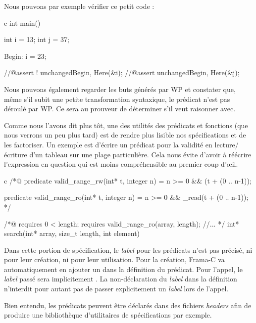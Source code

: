 Nous pouvons par exemple vérifier ce petit code :



\begin{CodeBlock}{c}
int main(){
  int i = 13;
  int j = 37;

 Begin:
  i = 23;
 
  //@assert ! unchanged{Begin, Here}(&i);
  //@assert   unchanged{Begin, Here}(&j);
}
\end{CodeBlock}



Nous pouvons également regarder les buts générés par WP et constater que, 
même s'il subit une petite transformation syntaxique, le prédicat n'est pas 
déroulé par WP. Ce sera au prouveur de déterminer s'il veut raisonner avec.



Comme nous l'avons dit plus tôt, une des utilités des prédicats et fonctions (que 
nous verrons un peu plus tard) est de rendre plus lisible nos spécifications et 
de les factoriser. Un exemple est d'écrire un prédicat pour la validité en 
lecture/écriture d'un tableau sur une plage particulière. Cela nous évite d'avoir
à réécrire l'expression en question qui est moins compréhensible au premier 
coup d’œil.



\begin{CodeBlock}{c}
/*@
  predicate valid_range_rw(int* t, integer n) =
    n >= 0 && \valid(t + (0 .. n-1));

  predicate valid_range_ro(int* t, integer n) =
    n >= 0 && \valid_read(t + (0 .. n-1));
*/

/*@
  requires 0 < length;
  requires valid_range_ro(array, length);
  //...
*/
int* search(int* array, size_t length, int element)
\end{CodeBlock}



Dans cette portion de spécification, le \textit{label} pour les prédicats n'est pas 
précisé, ni pour leur création, ni pour leur utilisation. Pour la création, 
Frama-C va automatiquement en ajouter un dans la définition du prédicat. 
Pour l'appel, le \textit{label} passé sera implicitement . La non-déclaration
du \textit{label} dans la définition n'interdit pour autant pas de passer explicitement
un \textit{label} lors de l'appel.



Bien entendu, les prédicats peuvent être déclarés dans des fichiers \textit{headers} afin
de produire une bibliothèque d'utilitaires de spécifications par exemple.




